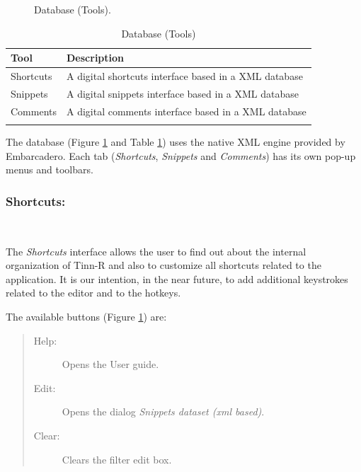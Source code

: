 \begin{figure}[H]
  \caption{Database (Tools).}
  \label{fig:tools_database}
\end{figure}

\begin{table}
  \begin{footnotesize}
    \begin{tabularx}{\textwidth}{>{\hsize=0.3\hsize}X>{\hsize=0.7\hsize}X}\\
      \hline
      \textbf{Tool} & \textbf{Description} \\
      \hline
      Shortcuts & A digital shortcuts interface based in a XML database \\
      Snippets & A digital snippets interface based in a XML database \\
      Comments & A digital comments interface based in a XML database \\
      \hline
      \\
    \end{tabularx}
  \end{footnotesize}
  \caption{Database (Tools)}
  \label{tab:tools_database}
\end{table}


The database
(Figure \ref{fig:tools_database} and
Table \ref{tab:tools_database})
uses the native XML engine provided by Embarcadero. Each tab
(\textit{Shortcuts}, \textit{Snippets} and
\textit{Comments}) has its own pop-up menus and toolbars.


\subsubsection{Shortcuts:}\\

The \textit{Shortcuts} interface allows the user to find out about
the internal organization of Tinn-R and also to customize all
shortcuts related to the application. It is our intention, in
the near future, to add additional keystrokes related to the
editor and to the \RR{} hotkeys.

The available buttons
(Figure \ref{fig:tools_database})
are:

\begin{quote}
  \begin{footnotesize}
    \begin{description}
      \item[Help:]
        Opens the User guide.
      \item[Edit:]
        Opens the dialog \textit{Snippets dataset (xml based)}.
      \item [Clear:]
        Clears the filter edit box.
    \end{description}
  \end{footnotesize}
\end{quote}

